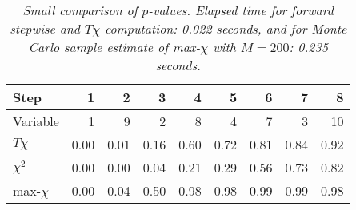 \begin{table}[ht]
\centering
\begin{tabular}{l|rrrrrrrr}
  \hline
Step & 1 & 2 & 3 & 4 & 5 & 6 & 7 & 8 \\ 
  \hline
Variable & 1 & 9 & 2 & 8 & 4 & 7 & 3 & 10 \\ 
  \hline
  $T\chi$ & 0.00 & 0.01 & 0.16 & 0.60 & 0.72 & 0.81 & 0.84 & 0.92 \\ 
  $\chi^2$ & 0.00 & 0.00 & 0.04 & 0.21 & 0.29 & 0.56 & 0.73 & 0.82 \\ 
  max-$\chi$ & 0.00 & 0.04 & 0.50 & 0.98 & 0.98 & 0.99 & 0.99 & 0.98 \\ 
   \hline
\end{tabular}
\caption{\em Small comparison of $p$-values. Elapsed time for forward stepwise \textit{and} $T\chi$ computation: 0.022 seconds, and for Monte Carlo sample estimate of max-$\chi$ with $M=200$: 0.235 seconds.} 
\label{tab:example}
\end{table}

